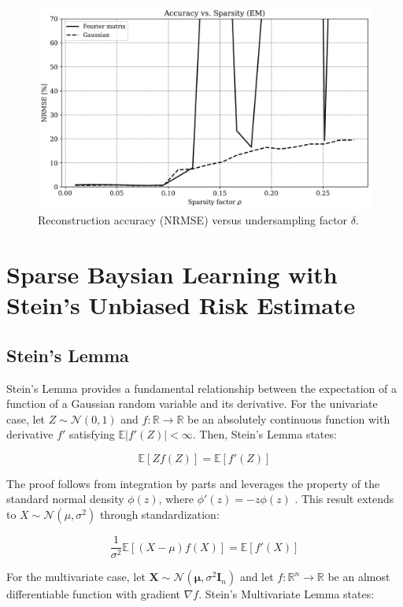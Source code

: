 \documentclass{article}
\begin{document}
\begin{figure}[H]
    \centering
    \includegraphics[width=0.75\linewidth]{Figures/accuracy_vs_sparsity_FFTGauss_EM.png}
    \caption{Reconstruction accuracy (NRMSE) versus undersampling factor $ \delta $.}
    \label{fig:accuracy_vs_sparsity_EM_gaussFFT}
\end{figure}


\section{Sparse Baysian Learning with Stein's Unbiased Risk Estimate}
\label{sec:SBL_SURE}
\subsection{Stein's Lemma}
Stein's Lemma provides a fundamental relationship between the expectation of a function of a Gaussian random variable and its derivative. For the univariate case, let $Z \sim \mathcal{N}(0, 1)$ and $f: \mathbb{R} \to \mathbb{R}$ be an absolutely continuous function with derivative $f'$ satisfying $\mathbb{E}|f'(Z)| < \infty$. Then, Stein's Lemma states:

\begin{equation}
    \mathbb{E}[Zf(Z)] = \mathbb{E}[f'(Z)]
\end{equation}

The proof follows from integration by parts and leverages the property of the standard normal density $\phi(z)$, where $\phi'(z) = -z\phi(z)$ \cite{Tibshirani2015SteinS}. This result extends to $X \sim \mathcal{N}(\mu, \sigma^2)$ through standardization:

\begin{equation}
    \frac{1}{\sigma^2}\mathbb{E}[(X - \mu)f(X)] = \mathbb{E}[f'(X)]
\end{equation}

For the multivariate case, let $\mathbf{X} \sim \mathcal{N}(\boldsymbol{\mu}, \sigma^2 \mathbf{I}_n)$ and let $f: \mathbb{R}^n \to \mathbb{R}$ be an almost differentiable function with gradient $\nabla f$. Stein's Multivariate Lemma states:
\end{document}
